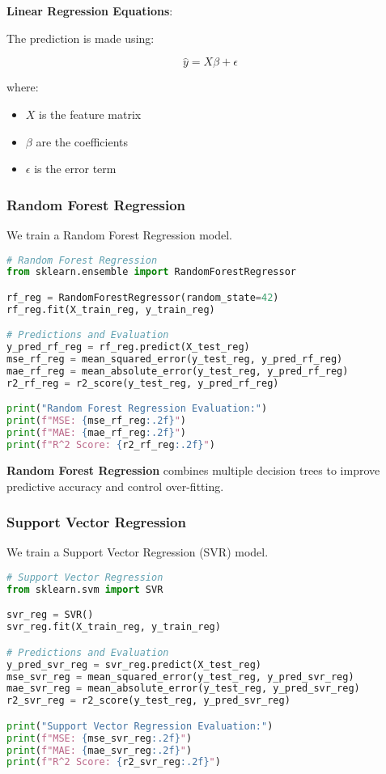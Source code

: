 \documentclass{article}
\begin{document}
\textbf{Linear Regression Equations}:

The prediction is made using:

\[
\hat{y} = X \beta + \epsilon
\]

where:
\begin{itemize}
    \item \( X \) is the feature matrix
    \item \( \beta \) are the coefficients
    \item \( \epsilon \) is the error term
\end{itemize}

\subsubsection{Random Forest Regression}

We train a Random Forest Regression model.

\begin{lstlisting}[language=Python]
# Random Forest Regression
from sklearn.ensemble import RandomForestRegressor

rf_reg = RandomForestRegressor(random_state=42)
rf_reg.fit(X_train_reg, y_train_reg)

# Predictions and Evaluation
y_pred_rf_reg = rf_reg.predict(X_test_reg)
mse_rf_reg = mean_squared_error(y_test_reg, y_pred_rf_reg)
mae_rf_reg = mean_absolute_error(y_test_reg, y_pred_rf_reg)
r2_rf_reg = r2_score(y_test_reg, y_pred_rf_reg)

print("Random Forest Regression Evaluation:")
print(f"MSE: {mse_rf_reg:.2f}")
print(f"MAE: {mae_rf_reg:.2f}")
print(f"R^2 Score: {r2_rf_reg:.2f}")
\end{lstlisting}

\textbf{Random Forest Regression} combines multiple decision trees to improve predictive accuracy and control over-fitting.

\subsubsection{Support Vector Regression}

We train a Support Vector Regression (SVR) model.

\begin{lstlisting}[language=Python]
# Support Vector Regression
from sklearn.svm import SVR

svr_reg = SVR()
svr_reg.fit(X_train_reg, y_train_reg)

# Predictions and Evaluation
y_pred_svr_reg = svr_reg.predict(X_test_reg)
mse_svr_reg = mean_squared_error(y_test_reg, y_pred_svr_reg)
mae_svr_reg = mean_absolute_error(y_test_reg, y_pred_svr_reg)
r2_svr_reg = r2_score(y_test_reg, y_pred_svr_reg)

print("Support Vector Regression Evaluation:")
print(f"MSE: {mse_svr_reg:.2f}")
print(f"MAE: {mae_svr_reg:.2f}")
print(f"R^2 Score: {r2_svr_reg:.2f}")
\end{lstlisting}
\end{document}
